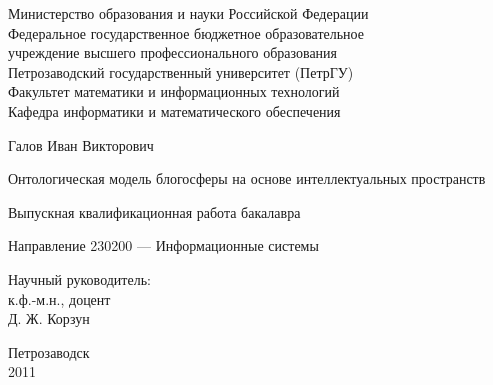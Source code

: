 
\thispagestyle{empty}
{ \large
\begin{center}
\renewcommand{\baselinestretch}{1}
Министерство образования и науки Российской Федерации\\
Федеральное государственное бюджетное образовательное\\
 учреждение высшего профессионального образования\\
Петрозаводский государственный университет (ПетрГУ)\\
Факультет математики и информационных технологий\\
Кафедра информатики и математического обеспечения

\end{center}
\vspace{4\bigskipamount}%

\begin{center}
Галов Иван Викторович
\end{center}
\medskip%

\begin{center}
{\Large Онтологическая модель блогосферы на основе
интеллектуальных пространств}
\end{center}
\medskip%

\begin{center}
Выпускная квалификационная работа бакалавра
\end{center}
\medskip%

\begin{center}
Направление 230200 --- Информационные системы
\end{center}

\vspace{4\bigskipamount}%

\begin{flushright}
\parbox{8cm}{%
\renewcommand{\baselinestretch}{1.2}
\normalsize
Научный руководитель:\\
к.ф.-м.н., доцент\\
Д. Ж. Корзун
}
\end{flushright}

\vfill%

\begin{center}
\large
Петрозаводск\\
2011
\end{center}
}
